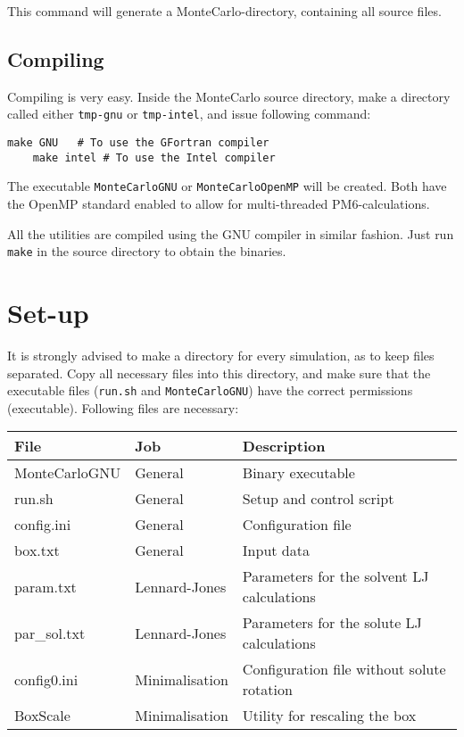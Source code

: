 	This command will generate a MonteCarlo-directory, containing all source 
	files.
	
	\subsection{Compiling}
	Compiling is very easy.
	Inside the MonteCarlo source directory, make a directory called either 
	\verb|tmp-gnu| or \verb|tmp-intel|, and issue following command:
	
	\begin{lstlisting}[caption=Compiling the main program]
	make GNU   # To use the GFortran compiler
	make intel # To use the Intel compiler
	\end{lstlisting}
	
	The executable \verb|MonteCarloGNU| or \verb|MonteCarloOpenMP| will be 
	created.
	Both have the OpenMP standard enabled to allow for multi-threaded 
	PM6-calculations.
	
	All the utilities are compiled using the GNU compiler in similar fashion.
	Just run \verb|make| in the source directory to obtain the binaries.
	
	\section{Set-up}
	It is strongly advised to make a directory for every simulation, as to keep 
	files separated. Copy all necessary files into this directory, and make 
	sure 
	that the executable files (\verb|run.sh| and \verb|MonteCarloGNU|) have the 
	correct permissions (executable). Following files are necessary:
	
	\begin{tabular}{lll}
		File & Job & Description \\ \hline \hline
		MonteCarloGNU & General & Binary executable \\
		run.sh & General & Setup and control script \\
		config.ini & General & Configuration file \\
		box.txt & General & Input data \\
		param.txt & Lennard-Jones & Parameters for the solvent LJ calculations 
		\\
		par\_sol.txt & Lennard-Jones & Parameters for the solute LJ 
		calculations \\
		config0.ini & Minimalisation & Configuration file without solute 
		rotation \\
		BoxScale & Minimalisation & Utility for rescaling the box \\
	\end{tabular}
	
